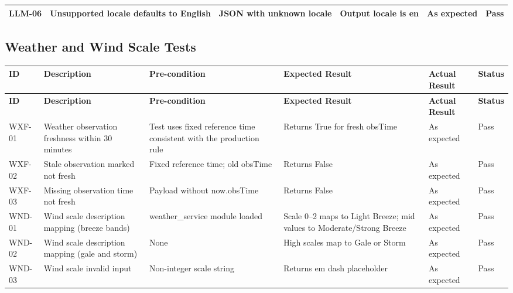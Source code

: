 \begin{appendices}
{\begin{longtable}{|p{1.2cm}|p{3.0cm}|p{2.8cm}|p{3.2cm}|p{2.2cm}|p{1.1cm}|}
LLM-06 &
Unsupported locale defaults to English &
JSON with unknown locale &
Output locale is en &
As expected &
Pass \\
\hline

\end{longtable}

\subsection*{Weather and Wind Scale Tests}
\begin{longtable}{|p{1.2cm}|p{3.0cm}|p{2.8cm}|p{3.2cm}|p{2.2cm}|p{1.1cm}|}
\hline
\textbf{ID} & \textbf{Description} & \textbf{Pre-condition} & \textbf{Expected Result} & \textbf{Actual Result} & \textbf{Status} \\
\hline
\endfirsthead
\hline
\textbf{ID} & \textbf{Description} & \textbf{Pre-condition} & \textbf{Expected Result} & \textbf{Actual Result} & \textbf{Status} \\
\hline
\endhead
\hline
\endfoot

WXF-01 &
Weather observation freshness within 30 minutes &
Test uses fixed reference time consistent with the production rule &
Returns True for fresh obsTime &
As expected &
Pass \\
\hline

WXF-02 &
Stale observation marked not fresh &
Fixed reference time; old obsTime &
Returns False &
As expected &
Pass \\
\hline

WXF-03 &
Missing observation time not fresh &
Payload without now.obsTime &
Returns False &
As expected &
Pass \\
\hline

WND-01 &
Wind scale description mapping (breeze bands) &
weather\_service module loaded &
Scale 0--2 maps to Light Breeze; mid values to Moderate/Strong Breeze &
As expected &
Pass \\
\hline

WND-02 &
Wind scale description mapping (gale and storm) &
None &
High scales map to Gale or Storm &
As expected &
Pass \\
\hline

WND-03 &
Wind scale invalid input &
Non-integer scale string &
Returns em dash placeholder &
As expected &
Pass \\
\hline

\end{longtable}

}
\end{appendices}
